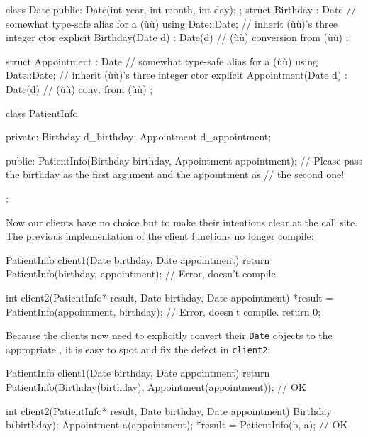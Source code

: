 \begin{emcppshiddenlisting}[emcppsbatch={e6,e7}]
class Date
{
public:
    Date(int year, int month, int day);
};
struct Birthday : Date  // somewhat type-safe alias for a (ù{}ù)
{
    using Date::Date;  // inherit (ù{}ù)'s three integer ctor
    explicit Birthday(Date d) : Date(d) { }  // (ù{}ù) conversion from (ù{}ù)
};

struct Appointment : Date  // somewhat type-safe alias for a (ù{}ù)
{
    using Date::Date;  // inherit (ù{}ù)'s three integer ctor
    explicit Appointment(Date d) : Date(d) { }  // (ù{}ù) conv. from (ù{}ù)
};
\end{emcppshiddenlisting}
\begin{emcppslisting}[emcppsbatch={e6,e7}]
class PatientInfo
{
private:
    Birthday d_birthday;
    Appointment d_appointment;

public:
    PatientInfo(Birthday birthday, Appointment appointment);
        // Please pass the birthday as the first argument and the appointment as
        // the second one! 
};
\end{emcppslisting}
    
\noindent Now our clients have no choice but to make their intentions clear at the
call site. The previous implementation of the client functions no longer compile:

\begin{emcppslisting}[emcppsbatch=e6,emcppserrorlines={1,2,4}]
PatientInfo client1(Date birthday, Date appointment)
{
    return PatientInfo(birthday, appointment);     // Error, doesn't compile.
}

int client2(PatientInfo* result, Date birthday, Date appointment)
{
    *result = PatientInfo(appointment, birthday);  // Error, doesn't compile.
    return 0;
}
\end{emcppslisting}
Because the clients now need to explicitly convert their \lstinline!Date! objects to the appropriate , it is easy to spot and fix the defect in \lstinline!client2!:
\begin{emcppslisting}[emcppsbatch=e7]
PatientInfo client1(Date birthday, Date appointment)
{
    return PatientInfo(Birthday(birthday), Appointment(appointment));  // OK
}

int client2(PatientInfo* result, Date birthday, Date appointment)
{
    Birthday b(birthday);
    Appointment a(appointment);
    *result = PatientInfo(b, a);  // OK
}
\end{emcppslisting}
    
